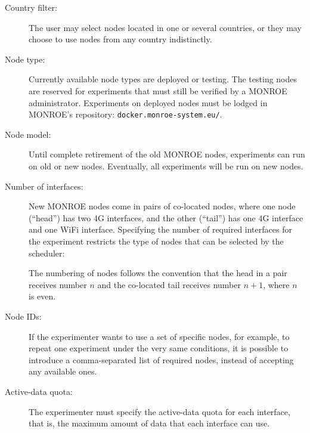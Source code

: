 \documentclass[a4paper,10pt]{article}
\newcommand{\monroe}{MONROE}
\newcommand{\identifier}[1]{{\texttt{\small{#1}}}}
\begin{document}
\begin{description}
	\item [Country filter:] The user may select nodes located in one or several countries, or they may choose to use nodes from any country indistinctly.
	\item [Node type:] %
	Currently available node types are deployed or testing.
	The testing nodes are reserved for experiments that must still be verified by a \monroe{} administrator.
	Experiments on deployed nodes must be lodged in \monroe{}'s repository: \identifier{docker.monroe-system.eu/}.
	\item [Node model:] Until complete retirement of the old \monroe{} nodes, experiments can run on old or new nodes. Eventually, all experiments will be run on new nodes.
	\item [Number of interfaces:] New \monroe{} nodes come in pairs of co-located nodes, where one node (``head'') has two 4G interfaces, and the other (``tail'') has one 4G interface and one WiFi interface.
	Specifying the number of required interfaces for the experiment restricts the type of nodes that can be selected by the scheduler:
	The numbering of nodes follows the convention that the head in a pair receives number $n$ and the co-located tail receives number $n+1$, where $n$ is even.
	\item [Node IDs:] If the experimenter wants to use a set of specific nodes, for example, to repeat one experiment under the very same conditions, it is possible to introduce a comma-separated list of required nodes, instead of accepting any available ones.
	\item [Active-data quota:] The experimenter must specify the active-data quota for each interface, that is, the maximum amount of data that each interface can use.

\end{description}
\end{document}
